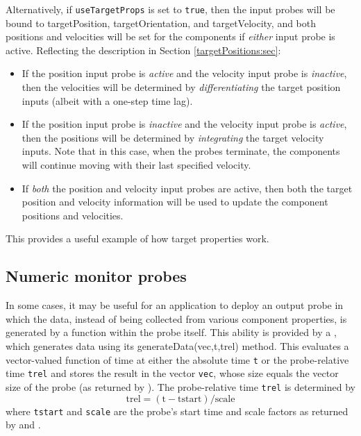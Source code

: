 \begin{itemize}
Alternatively, if {\tt useTargetProps} is set to {\tt true}, then the input
probes will be bound to {\sf targetPosition}, {\sf targetOrientation}, and {\sf
targetVelocity}, and both positions and velocities will be set for the
components if {\it either} input probe is active. Reflecting the description in
Section \ref{targetPositions:sec}:

\begin{itemize}

\item If the position input probe is {\it active} and the velocity input probe
is {\it inactive}, then the velocities will be determined by {\it
differentiating} the target position inputs (albeit with a one-step time lag).

\item If the position input probe is {\it inactive} and the velocity input probe
is {\it active}, then the positions will be determined by {\it integrating} the
target velocity inputs. Note that in this case, when the probes terminate, the
components will continue moving with their last specified velocity.

\item If {\it both} the position and velocity input probes are active,
then both the target position and velocity information will be used to update
the component positions and velocities.
	
\end{itemize}

This provides a useful example of how target properties work.

\end{itemize}

\subsection{Numeric monitor probes}
\label{NumericMonitorProbes:sec}

In some cases, it may be useful for an application to deploy an output probe in
which the data, instead of being collected from various component properties,
is generated by a function within the probe itself. This ability is provided by
a
, which generates
data using its  %
{generateData(vec,t,trel)}
method. This evaluates a vector-valued function of time at
either the absolute time {\tt t} or the probe-relative time {\tt trel}
and stores the result in the vector {\tt vec}, whose size equals the
vector size of the probe (as returned by
).  The
probe-relative time {\tt trel} is determined by
%
\begin{equation}
\text{trel} = (\text{t} - \text{tstart})/\text{scale}
\end{equation}
%
where {\tt tstart} and {\tt scale} are the probe's start time
and scale factors as returned by
 and
.

